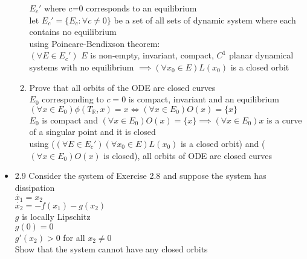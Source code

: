 \documentclass[12pt,letter]{article}
\newcommand{\R}{\mathbb{R}}
\begin{document}
\begin{itemize}
\begin{enumerate}
      $E_c'$ where c=0 corresponds to an equilibrium\\
      
      let $E_c'=\{E_c: \forall c \neq 0\}$ be a set of all sets of dynamic system where each contains no equilibrium\\

      using Poincare-Bendixson theorem:\\
      
      $(\forall E \in E_c')$ $E$ is non-empty, invariant, compact, $C^1$ planar dynamical systems with no equilibrium $\implies (\forall x_0 \in E)L(x_0)$ is a closed orbit\\

    \item Prove that all orbits of the ODE are closed curves\\
      
      $E_0$ corresponding to $c=0$ is compact, invariant and an equilibrium\\
      $(\forall x \in E_0)\phi(T_{\R},x)=x \Longleftrightarrow (\forall x \in E_0)O(x)=\{x\}$\\
      $E_0$ is compact and $(\forall x \in E_0)O(x)=\{x\} \implies (\forall x \in E_0) x$ is a curve of a singular point and it is closed\\

      using ($(\forall E \in E_c')(\forall x_0 \in E)L(x_0)$ is a closed orbit) and ($(\forall x \in E_0)O(x)$ is closed), all orbits of ODE are closed curves\\
      
    \end{enumerate}

    \pagebreak
    
  \item 2.9 Consider the system of Exercise 2.8 and suppose the system has dissipation\\
        
    $\dot{x_1}=x_2$\\
    $\dot{x_2}=-f(x_1)-g(x_2)$\\
    $g$ is locally Lipschitz\\
    $g(0)=0$\\
    $g'(x_2)>0$ for all $x_2 \neq 0$\\
    
    Show that the system cannot have any closed orbits\\



\end{itemize}
\end{document}
